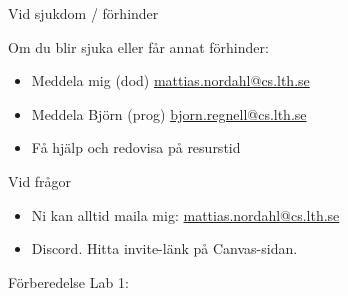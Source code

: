 \begin{Slide}{Vid sjukdom / förhinder}

  Om du blir sjuka eller får annat förhinder:
  \begin{itemize}
    \item Meddela mig (dod) \url{mattias.nordahl@cs.lth.se}
    \item Meddela Björn (prog) \url{bjorn.regnell@cs.lth.se}
    \item Få hjälp och redovisa på resurstid
  \end{itemize}
\end{Slide}
\begin{Slide}{Vid frågor}

  \begin{itemize}
    \item Ni kan alltid maila mig: \url{mattias.nordahl@cs.lth.se}
    \item Discord. Hitta invite-länk på Canvas-sidan.
  \end{itemize}
\end{Slide}


\fi  %


\begin{Slide}{Förberedelse Lab 1: \texttt{\LabWeekONEdod}}
    \label{unix}
        \begin{itemize}
        \end{itemize}
\end{Slide}

